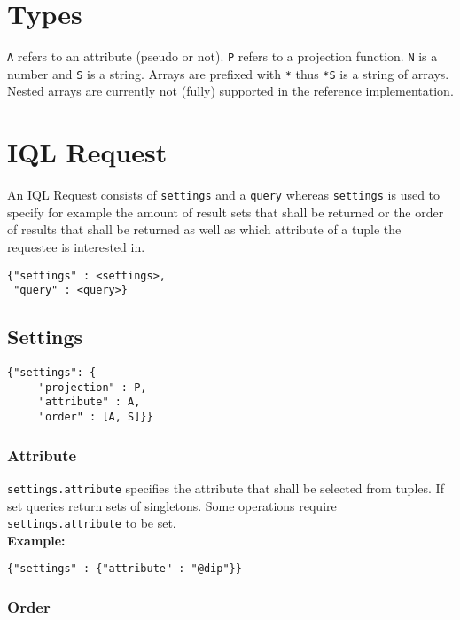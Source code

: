 \documentclass[a4paper]{article}
\begin{document}
\section{Types}

\verb|A| refers to an attribute (pseudo or not). \verb|P| refers to a projection function.
\verb|N| is a number and \verb|S| is a string. Arrays are prefixed with \verb|*| thus \verb|*S| is a string
of arrays. Nested arrays are currently not (fully) supported in the reference implementation.

\section{IQL Request}

An IQL Request consists of \verb|settings| and a \verb|query| whereas
\verb|settings| is used to specify for example the amount of result
sets that shall be returned or the order of results that shall be
returned as well as which attribute of a tuple the requestee is
interested in.

\begin{verbatim}
{"settings" : <settings>,
 "query" : <query>}
\end{verbatim}

\subsection{Settings}

\begin{verbatim}
{"settings": {
     "projection" : P,
     "attribute" : A,
     "order" : [A, S]}}
\end{verbatim}

\subsubsection{Attribute}

\verb|settings.attribute| specifies the attribute that shall be selected from tuples. If set queries return sets of singletons. Some operations require \verb|settings.attribute| to be set. \\

\textbf{Example:}
\begin{verbatim}
{"settings" : {"attribute" : "@dip"}}
\end{verbatim}

\subsubsection{Order}
\end{document}
